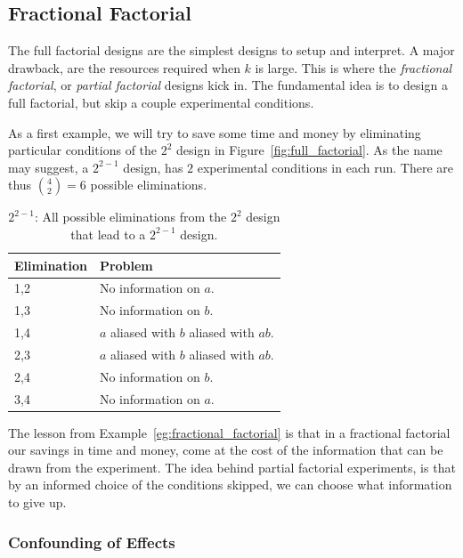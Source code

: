 \subsection{Fractional Factorial}
The full factorial designs are the simplest designs to setup and interpret. 
A major drawback, are the resources required when $k$ is large. 
This is where the \emph{fractional factorial}, or \emph{partial factorial} designs kick in.
The fundamental idea is to design a full factorial, but skip a couple experimental conditions. 

\begin{example}[From $2^2$ to $2^{(2-1)}$]
\label{eg:fractional_factorial}
As a first example, we will try to save some time and money by eliminating particular conditions of the $2^2$ design in Figure~\ref{fig:full_factorial}.
As the name may suggest, a $2^{2-1}$ design, has $2$ experimental conditions in each run. 
There are thus $\binom{4}{2}=6$ possible eliminations.
\begin{table}
\begin{tabular}{|p{2.5cm}|p{10cm}|}
\hline Elimination &  Problem \\ 
\hline
\hline 1,2 &  No information on $a$. \\ 
\hline 1,3 &  No information on $b$.\\ 
\hline 1,4 &  $a$ aliased with $b$ aliased with $ab$. \\ 
\hline 2,3 &  $a$ aliased with $b$ aliased with $ab$. \\ 
\hline 2,4 &  No information on $b$. \\ 
\hline 3,4 &  No information on $a$.\\ 
\hline 
\end{tabular} 
\label{tab:partial_factorial}
\caption{$2^{2-1}$: All possible eliminations from the $2^2$ design that lead to a $2^{2-1}$ design.}
\end{table}
\end{example}

The lesson from Example~\ref{eg:fractional_factorial} is that in a fractional factorial our savings in time and money, come at the cost of the information that can be drawn from the experiment.
The idea behind partial factorial experiments, is that by an informed choice of the conditions skipped, we can choose what information to give up.




\subsubsection{Confounding of Effects}

